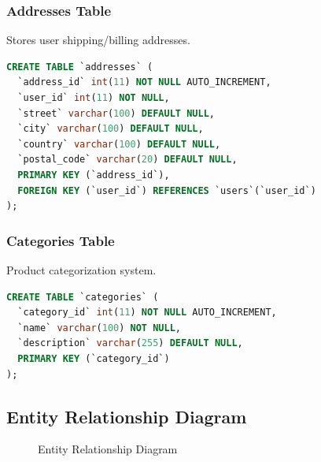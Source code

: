 \documentclass[12pt,a4paper]{article}
\begin{document}
\subsubsection{Addresses Table}
Stores user shipping/billing addresses.

\begin{lstlisting}[language=SQL, caption=Addresses Table Schema]
CREATE TABLE `addresses` (
  `address_id` int(11) NOT NULL AUTO_INCREMENT,
  `user_id` int(11) NOT NULL,
  `street` varchar(100) DEFAULT NULL,
  `city` varchar(100) DEFAULT NULL,
  `country` varchar(100) DEFAULT NULL,
  `postal_code` varchar(20) DEFAULT NULL,
  PRIMARY KEY (`address_id`),
  FOREIGN KEY (`user_id`) REFERENCES `users`(`user_id`)
);
\end{lstlisting}

\subsubsection{Categories Table}
Product categorization system.

\begin{lstlisting}[language=SQL, caption=Categories Table Schema]
CREATE TABLE `categories` (
  `category_id` int(11) NOT NULL AUTO_INCREMENT,
  `name` varchar(100) NOT NULL,
  `description` varchar(255) DEFAULT NULL,
  PRIMARY KEY (`category_id`)
);
\end{lstlisting}

\subsection{Entity Relationship Diagram}

\begin{figure}[H]
\centering
{}
\caption{Entity Relationship Diagram}
\end{figure}
\end{document}
